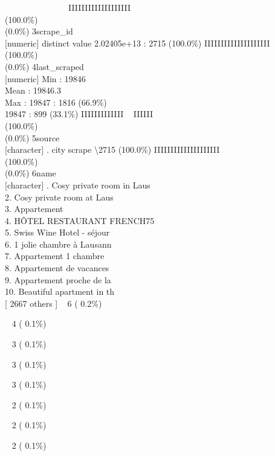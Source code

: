 \documentclass[
  journal,
]{IEEEtran}%
\begin{document}
~ ~ ~ ~ ~ ~ ~ ~ ~ IIIIIIIIIIIIIIIIIII \\
(100.0\%) \\
(0.0\%) \textbar{} \textbar{} 3\textbar scrape\_id\\
{[}numeric{]}  distinct value \textbar2.02405e+13 : 2715
(100.0\%) \textbar{} \textbar IIIIIIIIIIIIIIIIIIII \\
(100.0\%) \\
(0.0\%) \textbar{} \textbar{} 4\textbar last\_scraped\\
{[}numeric{]} \textbar Min : 19846\\
Mean : 19846.3\\
Max : 19847  : 1816 (66.9\%)\\
19847 : 899 (33.1\%) \textbar{} \textbar IIIIIIIIIIIII ~ IIIIII
\\
(100.0\%) \\
(0.0\%) \textbar{} \textbar{} 5\textbar source\\
{[}character{]} . city scrape \textbar\textbackslash2715
(100.0\%) \textbar{} \textbar IIIIIIIIIIIIIIIIIIII \\
(100.0\%) \\
(0.0\%) \textbar{} \textbar{} 6\textbar name\\
{[}character{]} . Cosy private room in Laus\\
2. Cosy private room at Laus\\
3. Appartement\\
4. HÔTEL RESTAURANT FRENCH75\\
5. Swiss Wine Hotel - séjour\\
6. 1 jolie chambre à Lausann\\
7. Appartement 1 chambre\\
8. Appartement de vacances\\
9. Appartement proche de la\\
10. Beautiful apartment in th\\
{[} 2667 others {]} \textbar~ 6 ( 0.2\%)\\
\strut ~ 4 ( 0.1\%)\\
\strut ~ 3 ( 0.1\%)\\
\strut ~ 3 ( 0.1\%)\\
\strut ~ 3 ( 0.1\%)\\
\strut ~ 2 ( 0.1\%)\\
\strut ~ 2 ( 0.1\%)\\
\strut ~ 2 ( 0.1\%)\\
\end{document}
